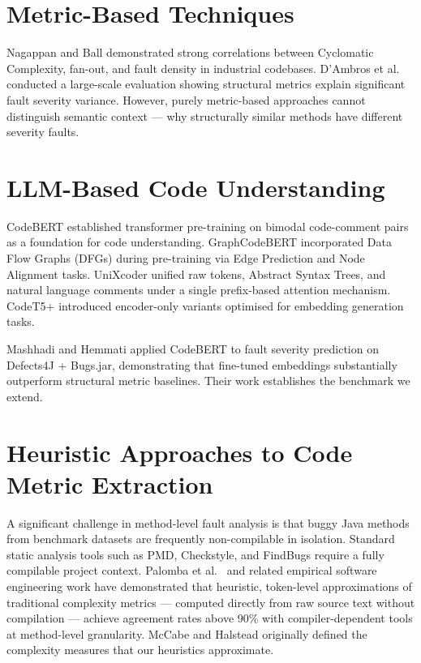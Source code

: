 \documentclass[12pt, a4paper]{report}
\begin{document}
\section{Metric-Based Techniques}

Nagappan and Ball \cite{ref2} demonstrated strong correlations between Cyclomatic Complexity, fan-out, and fault density in industrial codebases. D'Ambros et al.\ \cite{ref4} conducted a large-scale evaluation showing structural metrics explain significant fault severity variance. However, purely metric-based approaches cannot distinguish semantic context --- why structurally similar methods have different severity faults.

\section{LLM-Based Code Understanding}

CodeBERT \cite{codebert} established transformer pre-training on bimodal code-comment pairs as a foundation for code understanding. GraphCodeBERT \cite{graphcodebert} incorporated Data Flow Graphs (DFGs) during pre-training via Edge Prediction and Node Alignment tasks. UniXcoder \cite{unixcoder} unified raw tokens, Abstract Syntax Trees, and natural language comments under a single prefix-based attention mechanism. CodeT5+ \cite{codet5p} introduced encoder-only variants optimised for embedding generation tasks.

Mashhadi and Hemmati \cite{mashhadi} applied CodeBERT to fault severity prediction on Defects4J + Bugs.jar, demonstrating that fine-tuned embeddings substantially outperform structural metric baselines. Their work establishes the benchmark we extend.

\section{Heuristic Approaches to Code Metric Extraction}

A significant challenge in method-level fault analysis is that buggy Java methods from benchmark datasets are frequently non-compilable in isolation. Standard static analysis tools such as PMD, Checkstyle, and FindBugs require a fully compilable project context. Palomba et al.\ \cite{palomba} and related empirical software engineering work have demonstrated that heuristic, token-level approximations of traditional complexity metrics --- computed directly from raw source text without compilation --- achieve agreement rates above 90\% with compiler-dependent tools at method-level granularity. McCabe \cite{mccabe} and Halstead \cite{halstead} originally defined the complexity measures that our heuristics approximate.
\end{document}
